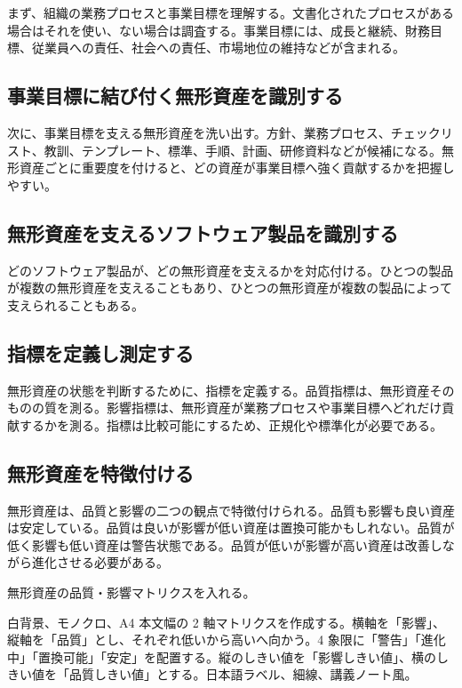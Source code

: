 \documentclass[a4paper,11pt]{article}
\begin{document}
まず、組織の業務プロセスと事業目標を理解する。文書化されたプロセスがある場合はそれを使い、ない場合は調査する。事業目標には、成長と継続、財務目標、従業員への責任、社会への責任、市場地位の維持などが含まれる。

\subsection{事業目標に結び付く無形資産を識別する}

次に、事業目標を支える無形資産を洗い出す。方針、業務プロセス、チェックリスト、教訓、テンプレート、標準、手順、計画、研修資料などが候補になる。無形資産ごとに重要度を付けると、どの資産が事業目標へ強く貢献するかを把握しやすい。

\subsection{無形資産を支えるソフトウェア製品を識別する}

どのソフトウェア製品が、どの無形資産を支えるかを対応付ける。ひとつの製品が複数の無形資産を支えることもあり、ひとつの無形資産が複数の製品によって支えられることもある。

\subsection{指標を定義し測定する}

無形資産の状態を判断するために、指標を定義する。品質指標は、無形資産そのものの質を測る。影響指標は、無形資産が業務プロセスや事業目標へどれだけ貢献するかを測る。指標は比較可能にするため、正規化や標準化が必要である。

\subsection{無形資産を特徴付ける}

無形資産は、品質と影響の二つの観点で特徴付けられる。品質も影響も良い資産は安定している。品質は良いが影響が低い資産は置換可能かもしれない。品質が低く影響も低い資産は警告状態である。品質が低いが影響が高い資産は改善しながら進化させる必要がある。

\begin{todobox}
無形資産の品質・影響マトリクスを入れる。
\end{todobox}
\begin{promptbox}
白背景、モノクロ、A4 本文幅の 2 軸マトリクスを作成する。横軸を「影響」、縦軸を「品質」とし、それぞれ低いから高いへ向かう。4 象限に「警告」「進化中」「置換可能」「安定」を配置する。縦のしきい値を「影響しきい値」、横のしきい値を「品質しきい値」とする。日本語ラベル、細線、講義ノート風。
\end{promptbox}
\end{document}
